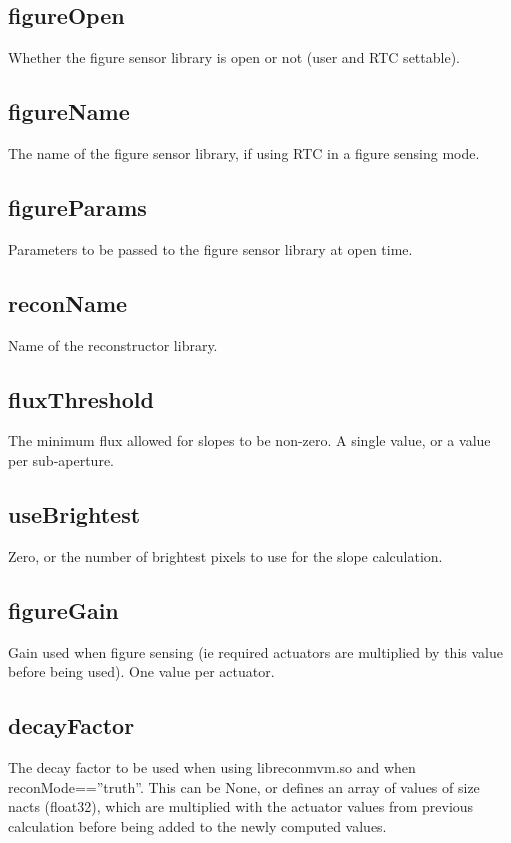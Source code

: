 \documentclass[a4,10pt]{article}
\begin{document}
\subsection{figureOpen}
Whether the figure sensor library is open or not (user and RTC
settable).

\subsection{figureName}
The name of the figure sensor library, if using RTC in a figure
sensing mode.

\subsection{figureParams}
Parameters to be passed to the figure sensor library at open time.

\subsection{reconName}
Name of the reconstructor library.

\subsection{fluxThreshold}
The minimum flux allowed for slopes to be non-zero.  A single value,
or a value per sub-aperture.

\subsection{useBrightest}
Zero, or the number of brightest pixels to use for the slope
calculation.

\subsection{figureGain}
Gain used when figure sensing (ie required actuators are multiplied by
this value before being used).  One value per actuator.

\subsection{decayFactor}
The decay factor to be used when using libreconmvm.so and when
reconMode==''truth''.  This can be None, or defines an array of values
of size nacts (float32), which are multiplied with the actuator values from
previous calculation before being added to the newly computed values.
\end{document}
